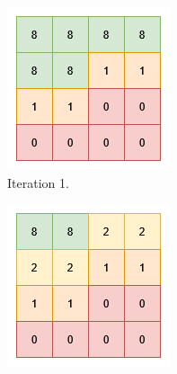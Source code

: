 \begin{figure}[htbp]
\begin{subfigure}[t]{0.24\textwidth}
        \includegraphics[width=\textwidth]{figures/voxel_grid_fmm_1.drawio.png}
        \caption{Iteration 1.}
    \end{subfigure}
    \hfill
    \begin{subfigure}[t]{0.24\textwidth}
        \centering
        \includegraphics[width=\textwidth]{figures/voxel_grid_fmm_2.drawio.png}

\end{subfigure}
\end{figure}
